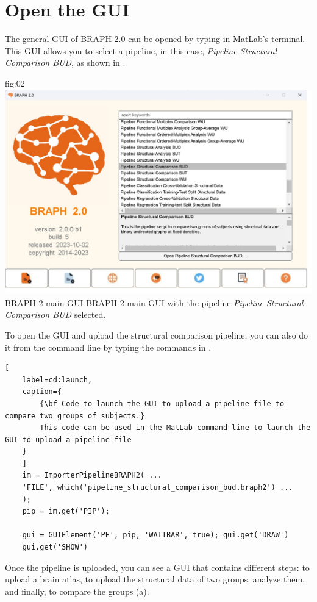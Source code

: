 \documentclass[justified]{tufte-handout}
\begin{document}
\section{Open the GUI}

The general GUI of BRAPH 2.0 can be opened by typing  in MatLab's terminal. This GUI allows you to select a pipeline, in this case, \emph{Pipeline Structural Comparison BUD}, as shown in .

{fig:02}
{
	\includegraphics{fig02.jpg}
}
{BRAPH 2 main GUI}
{
	BRAPH 2 main GUI with the pipeline \emph{Pipeline Structural Comparison BUD} selected.
}


\begin{tcolorbox}[
	title=Pipeline launch from command line
	]
	To open the GUI and upload the structural comparison pipeline, you can also do it from the command line by typing the commands in .

\begin{lstlisting}[
	label=cd:launch,
	caption={
		{\bf Code to launch the GUI to upload a pipeline file to compare two groups of subjects.}
		This code can be used in the MatLab command line to launch the GUI to upload a pipeline file
	}
	]
	im = ImporterPipelineBRAPH2( ...
	'FILE', which('pipeline_structural_comparison_bud.braph2') ...
	);
	pip = im.get('PIP');
	
	gui = GUIElement('PE', pip, 'WAITBAR', true); gui.get('DRAW')
	gui.get('SHOW')
\end{lstlisting}
\end{tcolorbox}


Once the pipeline is uploaded, you can see a GUI that contains different steps: to upload a brain atlas, to upload the structural data of two groups, analyze them, and finally, to compare the groups (a). 
\end{document}

